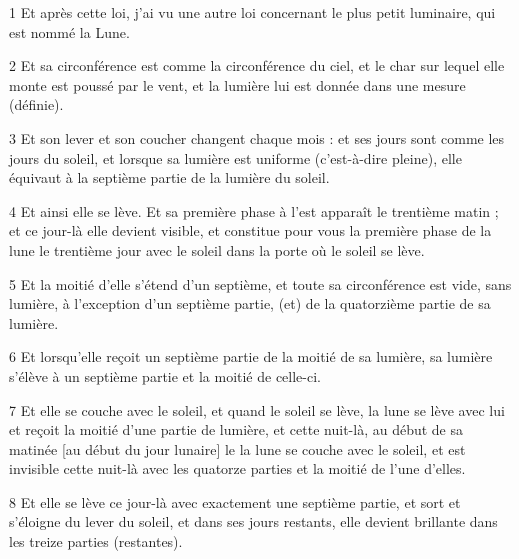 
\par 1 Et après cette loi, j'ai vu une autre loi concernant le plus petit luminaire, qui est nommé la Lune.
\par 2 Et sa circonférence est comme la circonférence du ciel, et le char sur lequel elle monte est poussé par le vent, et la lumière lui est donnée dans une mesure (définie).
\par 3 Et son lever et son coucher changent chaque mois : et ses jours sont comme les jours du soleil, et lorsque sa lumière est uniforme (c'est-à-dire pleine), elle équivaut à la septième partie de la lumière du soleil.
\par 4 Et ainsi elle se lève. Et sa première phase à l'est apparaît le trentième matin ; et ce jour-là elle devient visible, et constitue pour vous la première phase de la lune le trentième jour avec le soleil dans la porte où le soleil se lève.
\par 5 Et la moitié d'elle s'étend d'un septième, et toute sa circonférence est vide, sans lumière, à l'exception d'un septième partie, (et) de la quatorzième partie de sa lumière.
\par 6 Et lorsqu'elle reçoit un septième partie de la moitié de sa lumière, sa lumière s'élève à un septième partie et la moitié de celle-ci.
\par 7 Et elle se couche avec le soleil, et quand le soleil se lève, la lune se lève avec lui et reçoit la moitié d'une partie de lumière, et cette nuit-là, au début de sa matinée [au début du jour lunaire] le la lune se couche avec le soleil, et est invisible cette nuit-là avec les quatorze parties et la moitié de l'une d'elles.
\par 8 Et elle se lève ce jour-là avec exactement une septième partie, et sort et s'éloigne du lever du soleil, et dans ses jours restants, elle devient brillante dans les treize parties (restantes).


